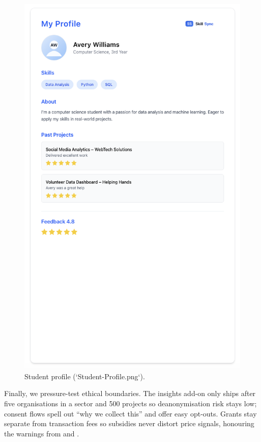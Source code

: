 \begin{figure}[h]
  \centering
  \includegraphics[width=0.8\linewidth]{figures/Student-Profile.png}
  \caption{Student profile (`Student-Profile.png`).}
  \label{fig:student-profile}
\end{figure}

Finally, we pressure-test ethical boundaries. The insights add-on only ships after five organisations in a sector and 500 projects so deanonymisation risk stays low; consent flows spell out ``why we collect this'' and offer easy opt-outs. Grants stay separate from transaction fees so subsidies never distort price signals, honouring the warnings from \citet{Zuboff2019} and \citet{Srnicek2017}.
